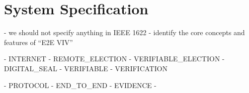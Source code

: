 \chapter{System Specification}
\label{chapter:specification}

- we should not specify anything in IEEE 1622
- identify the core concepts and features of ``E2E VIV''

- INTERNET
- REMOTE_ELECTION
- VERIFIABLE_ELECTION
- DIGITAL_SEAL
- VERIFIABLE
- VERIFICATION

- PROTOCOL
- END_TO_END
- EVIDENCE
- 
